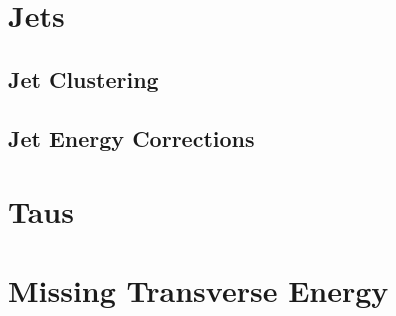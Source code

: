 
\section{Jets}


\subsection{Jet Clustering}

\cite{ARTICLE:TowardsJetography}

\cite{ARTICLE:AntiKtAlgorithm}

\cite{ARTICLE:FastJetUserManual}

\subsection{Jet Energy Corrections}

\cite{ARTICLE:CMSDeterminationJetEnergyCalibration}

\cite{ARTICLE:PileupSubtractionJetAreas}

\section{Taus}

\section{Missing Transverse Energy}

\cite{ARTICLE:CMSMissingTransverseEnergyPerformance}

\cite{ARTICLE:CMSMETPerformance8TeV}

